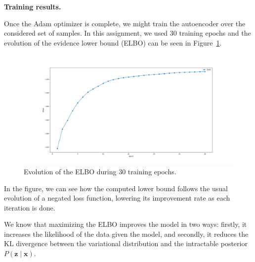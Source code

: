 \documentclass[11pt]{article}
\begin{document}
\textbf{Training results.}

Once the Adam optimizer is complete, we might train the autoencoder over the considered set of samples. In this assignment, we used 30 training epochs and the evolution of the evidence lower bound (ELBO) can be seen in Figure~\ref{img:elbo}.

\begin{figure}[H]
  \centering
  \includegraphics[scale = 0.3]{imgs/elbo.png}
  \caption{Evolution of the ELBO during 30 training epochs.}\label{img:elbo}
\end{figure}

In the figure, we can see how the computed lower bound follows the usual evolution of a negated loss function, lowering its improvement rate as each iteration is done.

We know that maximizing the ELBO improves the model in two ways: firstly, it increases the likelihood of the data given the model, and secondly, it reduces the KL divergence between the variational distribution and the intractable posterior \( P(\bm{z} \mid \bm{x}) \).
\end{document}

